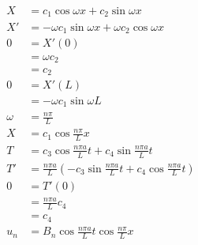 \documentclass{article}
\begin{document}
\begin{align*}
  X      & = c_1 \cos \omega x + c_2 \sin \omega x                                                                                       \\
  X'     & = -\omega c_1 \sin \omega x + \omega c_2 \cos \omega x                                                                        \\
  0      & = X'(0)                                                                                                                       \\
         & = \omega c_2                                                                                                                  \\
         & = c_2                                                                                                                         \\
  0      & = X'(L)                                                                                                                       \\
         & = -\omega c_1 \sin \omega L                                                                                                   \\
  \omega & = \frac{n \pi}{L}                                                                                                             \\
  X      & = c_1 \cos \frac{n \pi}{L} x                                                                                                  \\
  T      & = c_3 \cos \frac{n \pi a}{L} t + c_4 \sin \frac{n \pi a}{L} t                                                                 \\
  T'     & = \frac{n \pi a}{L} \left( -c_3 \sin \frac{n \pi a}{L} t + c_4 \cos \frac{n \pi a}{L} t \right)                               \\
  0      & = T'(0)                                                                                                                       \\
         & = \frac{n \pi a}{L} c_4                                                                                                       \\
         & = c_4                                                                                                                         \\
  u_n    & = B_n \cos \frac{n \pi a}{L} t \cos \frac{n \pi}{L} x                                                                         \\

\end{align*}
\end{document}
